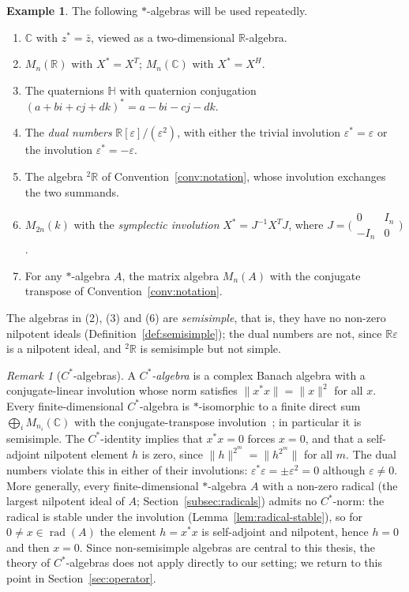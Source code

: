 \documentclass[12pt, a4paper]{report}
\theoremstyle{plain}
\theoremstyle{definition}
\newtheorem{example}[theorem]{Example}
\theoremstyle{remark}
\newtheorem{remark}[theorem]{Remark}
\theoremstyle{plain}
\newcommand{\rad}[0]{\operatorname{rad}} %
\newcommand{\RR}{\mathbb{R}}
\newcommand{\CC}{\mathbb{C}}
\newcommand{\HH}{\mathbb{H}}
\newcommand{\twoR}{{}^{2}\mathbb{R}}
\begin{document}
\begin{example}\label{ex:staralgs}
The following $*$-algebras will be used repeatedly.
\begin{enumerate}
  \item $\CC$ with $z^*=\bar z$, viewed as a two-dimensional $\RR$-algebra.
  \item $M_n(\RR)$ with $X^*=X^T$; $M_n(\CC)$ with $X^*=X^H$.
  \item The quaternions $\HH$ with quaternion conjugation $(a+bi+cj+dk)^*=a-bi-cj-dk$.
  \item The \emph{dual numbers} $\RR[\varepsilon]/(\varepsilon^2)$, with either the trivial involution $\varepsilon^*=\varepsilon$ or the involution $\varepsilon^*=-\varepsilon$.
  \item The algebra $\twoR$ of Convention~\ref{conv:notation}, whose involution exchanges the two summands.
  \item $M_{2n}(k)$ with the \emph{symplectic involution} $X^*=J^{-1}X^TJ$, where $J=\bigl(\begin{smallmatrix}0&I_n\\-I_n&0\end{smallmatrix}\bigr)$.
  \item For any $*$-algebra $A$, the matrix algebra $M_n(A)$ with the conjugate transpose of Convention~\ref{conv:notation}.
\end{enumerate}
The algebras in (2), (3) and (6) are \emph{semisimple}, that is, they have no non-zero nilpotent ideals (Definition~\ref{def:semisimple}); the dual numbers are not, since $\RR\varepsilon$ is a nilpotent ideal, and $\twoR$ is semisimple but not simple.
\end{example}

\begin{remark}[$C^*$-algebras]\label{rem:cstar}
A \emph{$C^*$-algebra} is a complex Banach algebra with a conjugate-linear involution whose norm satisfies $\|x^*x\|=\|x\|^2$ for all $x$. Every finite-dimensional $C^*$-algebra is $*$-isomorphic to a finite direct sum $\bigoplus_i M_{n_i}(\CC)$ with the conjugate-transpose involution~\cite[Theorem III.1.1]{Davidson1996}; in particular it is semisimple. The $C^*$-identity implies that $x^*x=0$ forces $x=0$, and that a self-adjoint nilpotent element $h$ is zero, since $\|h\|^{2^m}=\|h^{2^m}\|$ for all $m$. The dual numbers violate this in either of their involutions: $\varepsilon^*\varepsilon=\pm\varepsilon^2=0$ although $\varepsilon\neq 0$. More generally, every finite-dimensional $*$-algebra $A$ with a non-zero radical (the largest nilpotent ideal of $A$; Section~\ref{subsec:radicals}) admits no $C^*$-norm: the radical is stable under the involution (Lemma~\ref{lem:radical-stable}), so for $0\neq x\in\rad(A)$ the element $h=x^*x$ is self-adjoint and nilpotent, hence $h=0$ and then $x=0$. Since non-semisimple algebras are central to this thesis, the theory of $C^*$-algebras does not apply directly to our setting; we return to this point in Section~\ref{sec:operator}.
\end{remark}
\end{document}
